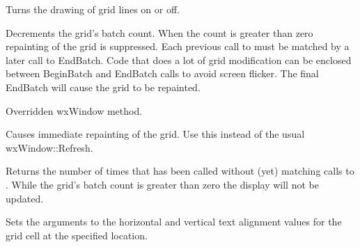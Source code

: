 \label{wxgridenablegridlines}


Turns the drawing of grid lines on or off.



\label{wxgridendbatch}


Decrements the grid's batch count. When the count is greater than zero repainting of
the grid is suppressed. Each previous call to
 must be matched by a later call to
EndBatch. Code that does a lot of grid modification can be enclosed between
BeginBatch and EndBatch calls to avoid screen flicker. The final EndBatch will
cause the grid to be repainted.





\label{wxgridfit}


Overridden wxWindow method.



\label{wxgridforcerefresh}


Causes immediate repainting of the grid. Use this instead of the usual wxWindow::Refresh.



\label{wxgridgetbatchcount}


Returns the number of times that  has been called
without (yet) matching calls to . While
the grid's batch count is greater than zero the display will not be updated.



\label{wxgridgetcellalignment}


Sets the arguments to the horizontal and vertical text alignment values for the
grid cell at the specified location.

